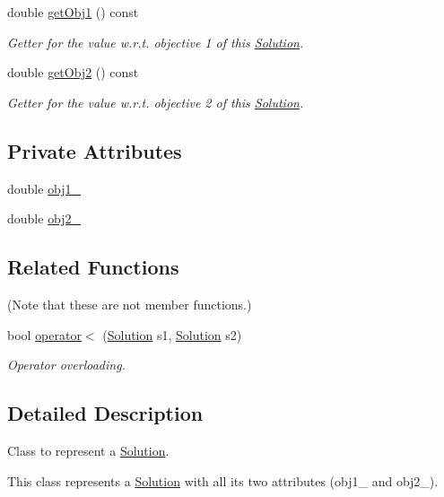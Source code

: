 \begin{DoxyCompactItemize}
double \hyperlink{classSolution_ad5a84b421bb7f9bd4692f5e2c9744a66}{get\-Obj1} () const 
\begin{DoxyCompactList}\small\item\em \-Getter for the value w.\-r.\-t. objective 1 of this {\ttfamily \hyperlink{classSolution}{\-Solution}}. \end{DoxyCompactList}\item 
double \hyperlink{classSolution_a8457d8ea6b5fd0ee13cc39b5625e8c3a}{get\-Obj2} () const 
\begin{DoxyCompactList}\small\item\em \-Getter for the value w.\-r.\-t. objective 2 of this {\ttfamily \hyperlink{classSolution}{\-Solution}}. \end{DoxyCompactList}\end{DoxyCompactItemize}
\subsection*{\-Private \-Attributes}
\begin{DoxyCompactItemize}
\item 
double \hyperlink{classSolution_a26b523893d8547f502f97bf7f990ef51}{obj1\-\_\-}
\item 
double \hyperlink{classSolution_a03abe5a30c04a2ec508d9177da80e3d2}{obj2\-\_\-}
\end{DoxyCompactItemize}
\subsection*{\-Related \-Functions}
(\-Note that these are not member functions.) \begin{DoxyCompactItemize}
\item 
bool \hyperlink{classSolution_a6e6e1e7f44e74350bfa000e5b6e002bf}{operator$<$} (\hyperlink{classSolution}{\-Solution} s1, \hyperlink{classSolution}{\-Solution} s2)
\begin{DoxyCompactList}\small\item\em \-Operator overloading. \end{DoxyCompactList}\end{DoxyCompactItemize}


\subsection{\-Detailed \-Description}
\-Class to represent a {\ttfamily \hyperlink{classSolution}{\-Solution}}. 

\-This class represents a {\ttfamily \hyperlink{classSolution}{\-Solution}} with all its two attributes (obj1\-\_\- and obj2\-\_\-). 

